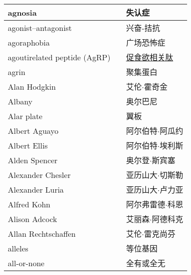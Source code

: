 \begin{longtable}{lll}
	\midrule
	agnosia     &&  失认症  \\
	
	\midrule
	agonist–antagonist     &&  兴奋-拮抗  \\
	
	\midrule
	agoraphobia     &&  广场恐怖症  \\
	
	\midrule
	agoutirelated peptide (AgRP)    &&  \href{https://baike.baidu.com/item/AGRP/1308711}{促食欲相关肽}  \\
	
	\midrule
	agrin     &&  聚集蛋白  \\
	
	\midrule
	Alan Hodgkin    &&  艾伦$\cdot$霍奇金  \\
	
	\midrule
	Albany   &&  奥尔巴尼  \\
	
	\midrule
	Alar plate     &&  翼板  \\
	
	\midrule
	Albert Aguayo     &&  阿尔伯特$\cdot$阿瓜约  \\
	
	\midrule
	Albert Ellis     &&  阿尔伯特$\cdot$埃利斯  \\
	
	\midrule
	Alden Spencer     &&  奥尔登$\cdot$斯宾塞  \\
	
	\midrule
	Alexander Chesler     &&  亚历山大$\cdot$切斯勒  \\
	
	\midrule
	Alexander Luria     &&  亚历山大$\cdot$卢力亚  \\
	
	\midrule
	Alfred Kohn     &&  阿尔弗雷德$\cdot$科恩  \\
	
	\midrule
	Alison Adcock     &&  艾丽森$\cdot$阿德科克  \\
	
	\midrule
	Allan Rechtschaffen     &&  艾伦$\cdot$雷克尚芬  \\
	
	\midrule
	alleles     &&  等位基因  \\
	
	\midrule
	all-or-none     &&  全有或全无  \\
	

\end{longtable}
